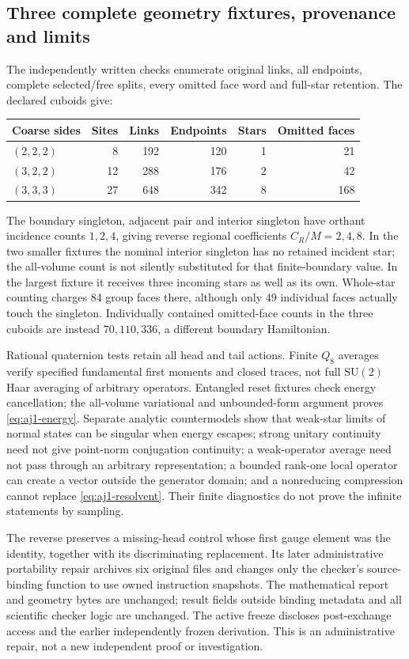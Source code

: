 \subsection{Three complete geometry fixtures, provenance and limits}
The independently written checks enumerate original links, all endpoints, complete selected/free splits, every omitted face word and full-star retention. The declared cuboids give:
\begin{center}\small
\begin{tabular}{@{}lrrrrr@{}}\toprule
Coarse sides & Sites & Links & Endpoints & Stars & Omitted faces\\\midrule
$(2,2,2)$&8&192&120&1&21\\
$(3,2,2)$&12&288&176&2&42\\
$(3,3,3)$&27&648&342&8&168\\\bottomrule
\end{tabular}
\end{center}
The boundary singleton, adjacent pair and interior singleton have orthant incidence counts $1,2,4$, giving reverse regional coefficients $C_R/M=2,4,8$. In the two smaller fixtures the nominal interior singleton has no retained incident star; the all-volume count is not silently substituted for that finite-boundary value. In the largest fixture it receives three incoming stars as well as its own. Whole-star counting charges 84 group faces there, although only 49 individual faces actually touch the singleton. Individually contained omitted-face counts in the three cuboids are instead $70,110,336$, a different boundary Hamiltonian.

Rational quaternion tests retain all head and tail actions. Finite $Q_8$ averages verify specified fundamental first moments and closed traces, not full $\mathrm{SU}(2)$ Haar averaging of arbitrary operators. Entangled reset fixtures check energy cancellation; the all-volume variational and unbounded-form argument proves \eqref{eq:aj1-energy}. Separate analytic countermodels show that weak-star limits of normal states can be singular when energy escapes; strong unitary continuity need not give point-norm conjugation continuity; a weak-operator average need not pass through an arbitrary representation; a bounded rank-one local operator can create a vector outside the generator domain; and a nonreducing compression cannot replace \eqref{eq:aj1-resolvent}. Their finite diagnostics do not prove the infinite statements by sampling.

The reverse preserves a missing-head control whose first gauge element was the identity, together with its discriminating replacement. Its later administrative portability repair archives six original files and changes only the checker's source-binding function to use owned instruction snapshots. The mathematical report and geometry bytes are unchanged; result fields outside binding metadata and all scientific checker logic are unchanged. The active freeze discloses post-exchange access and the earlier independently frozen derivation. This is an administrative repair, not a new independent proof or investigation.

